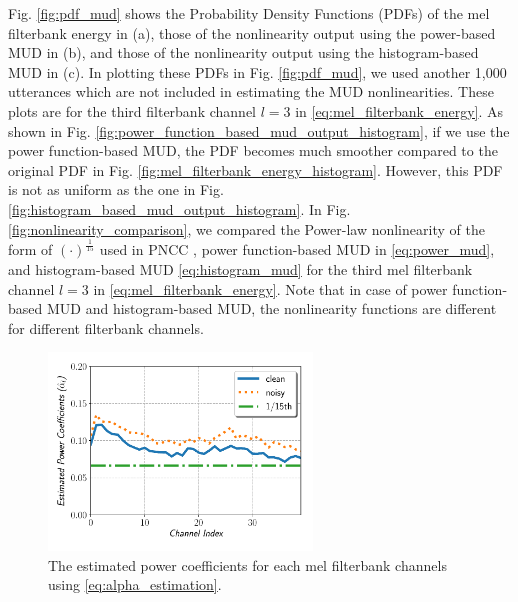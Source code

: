 \documentclass[a4paper]{article}
\begin{document}
Fig. \ref{fig:pdf_mud} shows the Probability Density Functions (PDFs)
of the  mel filterbank energy in (a), those of the nonlinearity output using 
the power-based MUD in (b), and those of the nonlinearity output
using the histogram-based MUD in (c). In plotting these PDFs in Fig.
\ref{fig:pdf_mud}, we used another 1,000 utterances which are not 
included in estimating the MUD nonlinearities. These plots are for the
third filterbank channel $l=3$ in \eqref{eq:mel_filterbank_energy}.
As shown in Fig. \ref{fig:power_function_based_mud_output_histogram}, 
if we use the power function-based MUD, the PDF becomes much smoother
compared to the original PDF in Fig. \ref{fig:mel_filterbank_energy_histogram}.
However, this PDF is not as uniform as the one in Fig.  
\ref{fig:histogram_based_mud_output_histogram}. In Fig.
\ref{fig:nonlinearity_comparison}, we compared the Power-law nonlinearity 
of the form of $(\cdot)^{\frac{1}{15}}$ used in PNCC
\cite{C_Kim_IEEETran_2016_1, C_Kim_ICASSP_2012_1},
power function-based MUD in \eqref{eq:power_mud}, 
and histogram-based MUD \eqref{eq:histogram_mud} for the
third mel filterbank channel $l=3$ in \eqref{eq:mel_filterbank_energy}. 
Note that in case of power function-based MUD and histogram-based MUD, the nonlinearity
functions are different for different filterbank channels.
%
%
\begin{figure}[tbp]
  \begin{center}
    \includegraphics[width=70mm]{estimated_power_coeff} 
    \caption {
      \label{fig:estimated_power_coeff}
      The estimated power coefficients for each mel filterbank channels using
      \eqref{eq:alpha_estimation}.
    }
  \end{center}
  \vspace{-7mm}
\end{figure}
%
%
\end{document}
